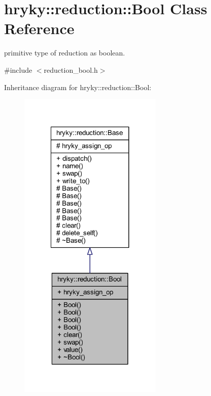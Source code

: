 \hypertarget{classhryky_1_1reduction_1_1_bool}{\section{hryky\-:\-:reduction\-:\-:Bool Class Reference}
\label{classhryky_1_1reduction_1_1_bool}
}


primitive type of reduction as boolean.  




{\ttfamily \#include $<$reduction\-\_\-bool.\-h$>$}



Inheritance diagram for hryky\-:\-:reduction\-:\-:Bool\-:
\nopagebreak
\begin{figure}[H]
\begin{center}
\leavevmode
\includegraphics[width=194pt]{classhryky_1_1reduction_1_1_bool__inherit__graph}
\end{center}
\end{figure}

